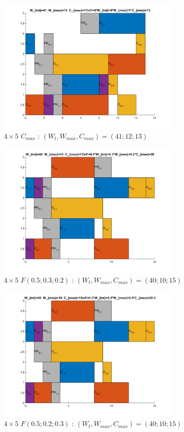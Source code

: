 \documentclass[10pt,a4paper]{scrartcl}
\begin{document}
\begin{figure}
  \centering
  \includegraphics[width=0.8\textwidth]{img/results4x5_Cmax.png}
  \caption{$4 \times 5$ $C_{max}$ : $(W_t, W_{max}, C_{max}) = (41; 12; 13)$}
\end{figure}
\begin{figure}
  \centering
  \includegraphics[width=0.8\textwidth]{img/results4x5_F050302.png}
  \caption{$4 \times 5$ $F(0.5;0.3;0.2)$ : $(W_t, W_{max}, C_{max}) = (40; 10; 15)$}
\end{figure}
\begin{figure}
  \centering
  \includegraphics[width=0.8\textwidth]{img/results4x5_F050203.png}
  \caption{$4 \times 5$ $F(0.5;0.2;0.3)$ : $(W_t, W_{max}, C_{max}) = (40; 10; 15)$}
\end{figure}
\clearpage
\end{document}
